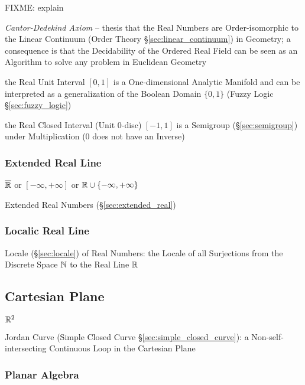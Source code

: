 FIXME: explain

\emph{Cantor-Dedekind Axiom} -- thesis that the Real Numbers are
Order-isomorphic to the Linear Continuum (Order Theory
\S\ref{sec:linear_continuum}) in Geometry; a consequence is that the
Decidability of the Ordered Real Field can be seen as an Algorithm to solve any
problem in Euclidean Geometry

the Real Unit Interval $[0,1]$ is a One-dimensional Analytic Manifold and can be
interpreted as a generalization of the Boolean Domain $\{0, 1\}$ (Fuzzy Logic
\S\ref{sec:fuzzy_logic})

the Real Closed Interval (Unit 0-disc) $[-1,1]$ is a Semigroup
(\S\ref{sec:semigroup}) under Multiplication ($0$ does not have an Inverse)



\subsubsection{Extended Real Line}\label{sec:extended_real_line}

$\overline{\mathbb{R}}$ or $[-\infty, +\infty]$ or $\mathbb{R} \cup \{
-\infty, +\infty\}$

Extended Real Numbers (\S\ref{sec:extended_real})




\subsubsection{Localic Real Line}\label{sec:localic_real_line}

Locale (\S\ref{sec:locale}) of Real Numbers: the Locale of all Surjections from
the Discrete Space $\mathbb{N}$ to the Real Line $\mathbb{R}$



\subsection{Cartesian Plane}\label{sec:cartesian_plane}

$\mathbb{R}^2$

Jordan Curve (Simple Closed Curve \S\ref{sec:simple_closed_curve}): a
Non-self-intersecting Continuous Loop in the Cartesian Plane



\subsubsection{Planar Algebra}\label{sec:planar_algebra}

